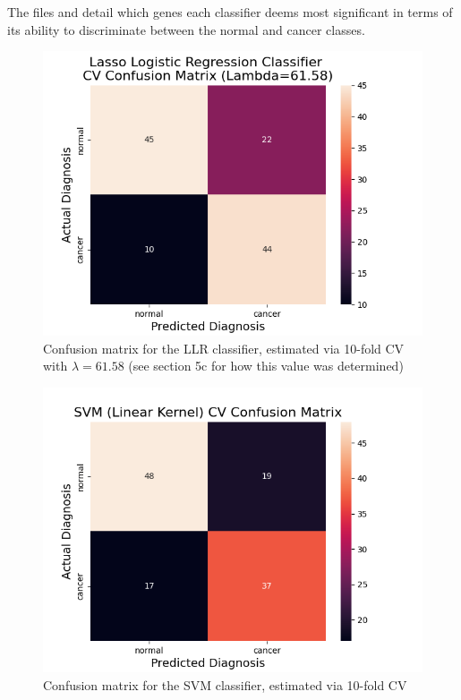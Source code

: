 \documentclass[twocolumn]{article}
\begin{document}
The files  and  detail which genes each classifier deems most significant in terms of its ability to discriminate between the normal and cancer classes.

\begin{figure}[H]
    \centering
    \includegraphics[width=\linewidth]{figures/Lasso_Logistic_Regression_Classifier_CV_Confusion_Matrix.png}
    \caption{Confusion matrix for the LLR classifier, estimated via 10-fold CV with $\lambda = 61.58$ (see section 5c for how this value was determined)}
    \label{fig:cm-lasso}
\end{figure}

\begin{figure}[H]
    \centering
    \includegraphics[width=\linewidth]{figures/SVM_(Linear_Kernel)_CV_Confusion_Matrix.png}
    \caption{Confusion matrix for the SVM classifier, estimated via 10-fold CV}
    \label{fig:cm-svm}
\end{figure}
\end{document}
